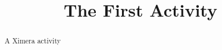 \documentclass{ximera}
\title{The First Activity}
\begin{document}
\begin{abstract}
A Ximera activity
\end{abstract}
\maketitle
\end{document}
